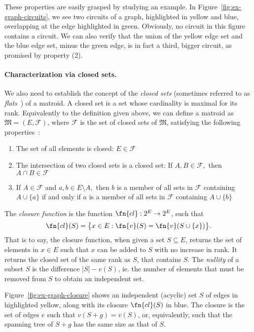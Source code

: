 These properties are easily grasped by studying an example. In Figure~\ref{fig:ex-graph-circuits}, we see two circuits of a graph, highlighted in yellow and blue, overlapping at the edge highlighted in green. Obviously, no circuit in this figure contains a circuit. We can also verify that the union of the yellow edge set and the blue edge set, minus the green edge, is in fact a third, bigger circuit, as promised by property (2).

\paragraph{Characterization via closed sets.} We also need to establish the concept of the \textit{closed sets} (sometimes referred to as \textit{flats}~\cite{schrijver-2003}) of a matroid. A closed set is a set whose cardinality is maximal for its rank. Equivalently to the definition given above, we can define a matroid as $\mathfrak{M} = (E, \mathcal{F})$, where $\mathcal{F}$ is the set of closed sets of $\mathfrak{M}$, satisfying the following properties~\cite{knuth-1975}:

\begin{enumerate}
  \item The set of all elements is closed: $E \in \mathcal{F}$
  \item The intersection of two closed sets is a closed set: If $A,B \in \mathcal{F},$ then $A \cap B \in \mathcal{F}$
  \item If $A \in \mathcal{F}$ and $a,b \in E \setminus A,$ then $b$ is a member of all sets in $\mathcal{F}$ containing $A \cup \{a\}$ if and only if $a$ is a member of all sets in $\mathcal{F}$ containing $A \cup \{b\}$
\end{enumerate}

The \textit{closure function} is the function $\fn{cl} : 2^E \to 2^E$, such that $$\fn{cl}(S) = \bigl\{ x \in E : \fn{v}(S) = \fn{v}(S \cup \{x\}) \bigr\}.$$ That is to say, the closure function, when given a set $S \subseteq E$, returns the set of elements in $x \in E$ such that $x$ can be added to $S$ with no increase in rank. It returns the closed set of the same rank as $S$, that contains $S$. The \textit{nullity} of a subset $S$ is the difference $|S| - v(S)$, ie. the number of elements that must be removed from $S$ to obtain an independent set.

Figure~\ref{fig:ex-graph-closure} shows an independent (acyclic) set $S$ of edges in highlighted yellow, along with its closure $\fn{cl}(S)$ in blue. The closure is the set of edges $e$ such that $v(S+g) = v(S)$, or, equivalently, such that the spanning tree of $S+g$ has the same size as that of $S$.

